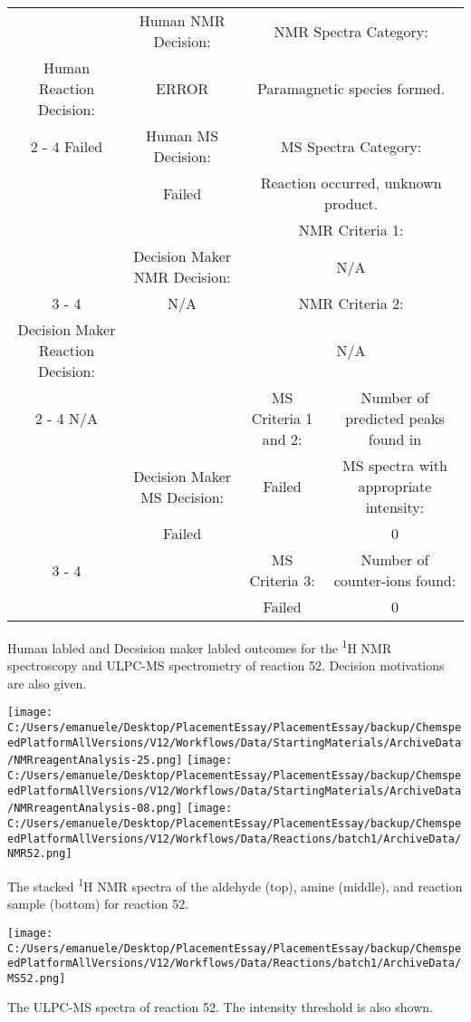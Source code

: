 \documentclass{article}%
\begin{document}
\begin{Decision Table}[H]%
\begin{tabular}{|c|c|c|c|}%
\hline%
&Human NMR Decision:&\multicolumn{2}{|c|}{NMR Spectra Category:}\\%
Human Reaction Decision:&ERROR&\multicolumn{2}{|c|}{Paramagnetic species formed.}\\%
\cline{2%
-%
4}%
Failed&Human MS Decision:&\multicolumn{2}{|c|}{MS Spectra Category:}\\%
&Failed&\multicolumn{2}{|c|}{Reaction occurred, unknown product.}\\%
\hline%
&&\multicolumn{2}{|c|}{NMR Criteria 1:}\\%
&Decision Maker NMR Decision:&\multicolumn{2}{|c|}{N/A}\\%
\cline{3%
-%
4}%
&N/A&\multicolumn{2}{|c|}{NMR Criteria 2:}\\%
Decision Maker Reaction Decision:&&\multicolumn{2}{|c|}{N/A}\\%
\cline{2%
-%
4}%
N/A&&MS Criteria 1 and 2:&Number of predicted peaks found in\\%
&Decision Maker MS Decision:&Failed&MS spectra with appropriate intensity:\\%
&Failed&&0\\%
\cline{3%
-%
4}%
&&MS Criteria 3:&Number of counter{-}ions found:\\%
&&Failed&0\\%
\hline%
\end{tabular}%
\caption{Human labled and Decsision maker labled outcomes for the \textsuperscript{1}H NMR spectroscopy and ULPC-MS spectrometry of reaction 52. Decision motivations are also given.}%
\end{Decision Table}%
\begin{NMR Spectra}[H]%
\begin{center}%
\texttt{[image: C:/Users/emanuele/Desktop/PlacementEssay/PlacementEssay/backup/ChemspeedPlatformAllVersions/V12/Workflows/Data/StartingMaterials/ArchiveData/NMRreagentAnalysis-25.png]}\hfill%
\texttt{[image: C:/Users/emanuele/Desktop/PlacementEssay/PlacementEssay/backup/ChemspeedPlatformAllVersions/V12/Workflows/Data/StartingMaterials/ArchiveData/NMRreagentAnalysis-08.png]}\hfill%
\texttt{[image: C:/Users/emanuele/Desktop/PlacementEssay/PlacementEssay/backup/ChemspeedPlatformAllVersions/V12/Workflows/Data/Reactions/batch1/ArchiveData/NMR52.png]}\hfill%
\end{center}%
\caption{The stacked \textsuperscript{1}H NMR spectra of the aldehyde (top), amine (middle), and reaction sample (bottom) for reaction 52.}%
\end{NMR Spectra}%
\begin{MS Spectra}[H]%
\begin{center}%
\texttt{[image: C:/Users/emanuele/Desktop/PlacementEssay/PlacementEssay/backup/ChemspeedPlatformAllVersions/V12/Workflows/Data/Reactions/batch1/ArchiveData/MS52.png]}\hfill%
\end{center}%
\caption{The ULPC-MS spectra of reaction 52. The intensity threshold is also shown.}%
\end{MS Spectra}%
\end{document}
